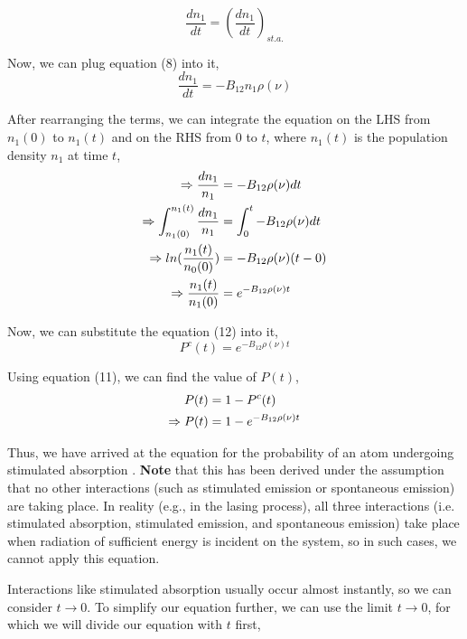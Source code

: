 \documentclass[12pt]{article}
\begin{document}
\begin{equation*}
    \frac{dn_{1}}{dt} = (\frac{dn_{1}}{dt})_{st.a.}
\end{equation*} \vspace{.1cm}

Now, we can plug equation (8) into it,
\begin{equation*}
    \frac{dn_{1}}{dt} = -B_{12}n_{1}\rho(\nu) 
\end{equation*}

After rearranging the terms, we can integrate the equation on the LHS from $n_{1}(0)$ to $n_{1}(t)$ and on the RHS from $0$ to $t$, where $n_{1}(t)$ is the population density $n_{1}$ at time $t$,
\begin{align}
    \Rightarrow \frac{dn_{1}}{n_{1}} & = -B_{12}\rho(\nu)dt \notag \\
    \Rightarrow \int_{n_{1}(0)}^{n_{1}(t)} \frac{dn_{1}}{n_{1}} & = \int_{0}^{t} -B_{12}\rho(\nu)dt \notag \\
    \Rightarrow ln(\frac{n_{1}(t)}{n_{0}(0)}) & = -B_{12}\rho(\nu)(t - 0) \notag \\
    \Rightarrow \frac{n_{1}(t)}{n_{1}(0)} & = e^{-B_{12}\rho(\nu)t}
\end{align}

Now, we can substitute the equation (12) into it,
\begin{equation*}
    P^c(t) = e^{-B_{12}\rho(\nu)t}
\end{equation*}

Using equation (11), we can find the value of $P(t)$,
\begin{align}
    P(t) & = 1 - P^c(t) \notag \\
    \Rightarrow P(t) & = 1 - e^{-B_{12}\rho(\nu)t}
\end{align}

Thus, we have arrived at the equation for the probability of an atom undergoing stimulated absorption . \textbf{Note} that this has been derived under the assumption that no other interactions (such as stimulated emission or spontaneous emission) are taking place. In reality (e.g., in the lasing process), all three interactions (i.e. stimulated absorption, stimulated emission, and spontaneous emission) take place when radiation of sufficient energy is incident on the system, so in such cases, we cannot apply this equation. \vspace{.2cm}

Interactions like stimulated absorption usually occur almost instantly, so we can consider $t \rightarrow 0$. To simplify our equation further, we can use the limit $t \rightarrow 0$, for which we will divide our equation with $t$ first,
\end{document}
